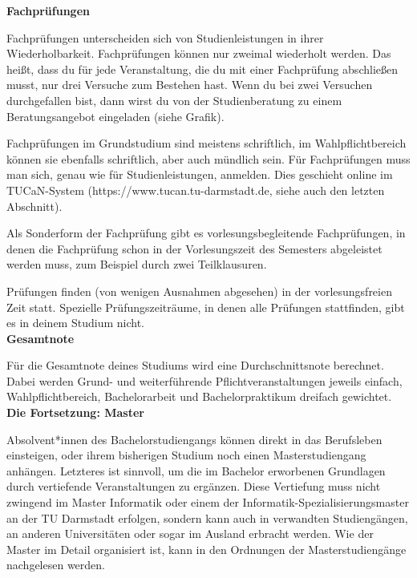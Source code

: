 {    \noindent\textbf{Fachprüfungen}

    Fachprüfungen unterscheiden sich von Studienleistungen in ihrer Wiederholbarkeit. Fachprüfungen können nur zweimal wiederholt werden. Das heißt, dass du für jede Veranstaltung, die du mit einer Fachprüfung abschließen musst, nur drei Versuche zum Bestehen hast. Wenn du bei zwei Versuchen durchgefallen bist, dann wirst du von der Studienberatung zu einem Beratungsangebot eingeladen (siehe Grafik).


    Fachprüfungen im Grundstudium sind meistens schriftlich, im Wahlpflichtbereich können sie ebenfalls schriftlich, aber auch mündlich sein. Für Fachprüfungen muss man sich, genau wie für Studienleistungen, anmelden. Dies geschieht online im TUCaN-System (https://www.tucan.tu-darmstadt.de, siehe auch den letzten Abschnitt).

    Als Sonderform der Fachprüfung gibt es vorlesungsbegleitende Fachprüfungen, in denen die Fachprüfung schon in der Vorlesungszeit des Semesters abgeleistet werden muss, zum Beispiel durch zwei Teilklausuren.

    Prüfungen finden (von wenigen Ausnahmen abgesehen) in der vorlesungsfreien Zeit statt. Spezielle Prüfungszeiträume, in denen alle Prüfungen stattfinden, gibt es in deinem Studium nicht.\\

    \noindent\textbf{Gesamtnote}

    Für die Gesamtnote deines Studiums wird eine Durchschnittsnote berechnet. Dabei werden Grund- und weiterführende Pflichtveranstaltungen jeweils einfach, Wahlpflichtbereich, Bachelorarbeit und Bachelorpraktikum dreifach gewichtet.\\

    \noindent\textbf{Die Fortsetzung: Master}

    Absolvent*innen des Bachelorstudiengangs können direkt in das Berufsleben einsteigen, oder ihrem bisherigen Studium noch einen Masterstudiengang anhängen. Letzteres ist sinnvoll, um die im Bachelor erworbenen Grundlagen durch vertiefende Veranstaltungen zu ergänzen. Diese Vertiefung muss nicht zwingend im Master Informatik oder einem der Informatik-Spezialisierungsmaster an der TU Darmstadt erfolgen, sondern kann auch in verwandten Studiengängen, an anderen Universitäten oder sogar im Ausland erbracht werden. Wie der Master im Detail organisiert ist, kann in den Ordnungen der Masterstudiengänge nachgelesen werden.

}
